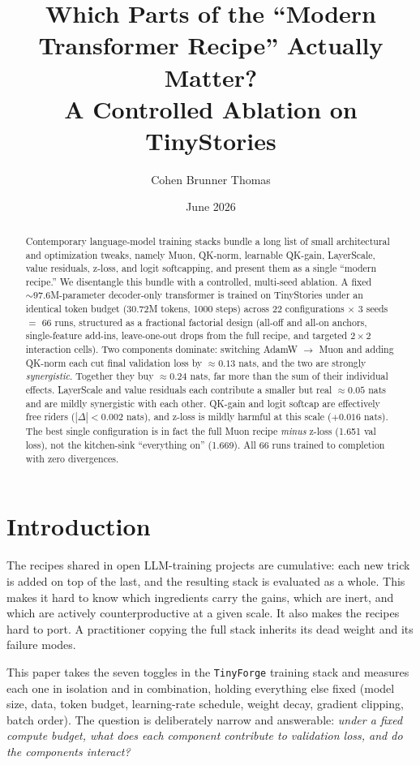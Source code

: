 \documentclass[11pt]{article}
\title{Which Parts of the ``Modern Transformer Recipe'' Actually Matter?\\
A Controlled Ablation on TinyStories}
\author{Cohen Brunner Thomas}
\date{June 2026}
\begin{document}
\maketitle

\begin{abstract}
Contemporary language-model training stacks bundle a long list of small
architectural and optimization tweaks, namely Muon, QK-norm, learnable QK-gain,
LayerScale, value residuals, z-loss, and logit softcapping, and present them as a
single ``modern recipe.'' We disentangle this bundle with a controlled,
multi-seed ablation. A fixed ${\sim}97.6$M-parameter decoder-only transformer is
trained on TinyStories under an identical token budget (30.72M tokens, 1000
steps) across 22 configurations $\times$ 3 seeds $=$ 66 runs, structured as a
fractional factorial design (all-off and all-on anchors, single-feature add-ins,
leave-one-out drops from the full recipe, and targeted $2\times2$ interaction
cells). Two components dominate: switching AdamW $\to$ Muon and adding QK-norm
each cut final validation loss by ${\approx}0.13$ nats, and the two are strongly
\emph{synergistic}. Together they buy ${\approx}0.24$ nats, far more than the
sum of their individual effects. LayerScale and value residuals each contribute
a smaller but real ${\approx}0.05$ nats and are mildly synergistic with each
other. QK-gain and logit softcap are effectively free riders ($|\Delta| < 0.002$
nats), and z-loss is mildly harmful at this scale ($+0.016$ nats). The best
single configuration is in fact the full Muon recipe \emph{minus} z-loss (1.651
val loss), not the kitchen-sink ``everything on'' (1.669). All 66 runs trained
to completion with zero divergences.
\end{abstract}

\section{Introduction}

The recipes shared in open LLM-training projects are cumulative: each new trick
is added on top of the last, and the resulting stack is evaluated as a whole.
This makes it hard to know which ingredients carry the gains, which are inert,
and which are actively counterproductive at a given scale. It also makes the
recipes hard to port. A practitioner copying the full stack inherits its dead
weight and its failure modes.

This paper takes the seven toggles in the \texttt{TinyForge} training
stack and measures each one in isolation and in combination, holding everything
else fixed (model size, data, token budget, learning-rate schedule, weight
decay, gradient clipping, batch order). The question is deliberately narrow and
answerable: \emph{under a fixed compute budget, what does each component
contribute to validation loss, and do the components interact?}
\end{document}
